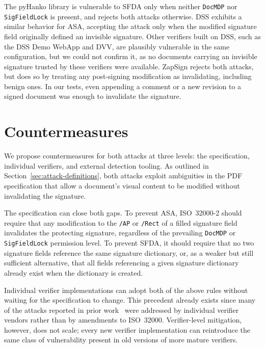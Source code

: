 \documentclass[12pt]{article}
\begin{document}
The pyHanko library is vulnerable to SFDA only when neither \texttt{DocMDP} nor \texttt{SigFieldLock} is present, and rejects both attacks otherwise. DSS exhibits a similar behavior for ASA, accepting the attack only when the modified signature field originally defined an invisible signature. Other verifiers built on DSS, such as the DSS Demo WebApp and DVV, are plausibly vulnerable in the same configuration, but we could not confirm it, as no documents carrying an invisible signature trusted by these verifiers were available. ZapSign rejects both attacks, but does so by treating any post-signing modification as invalidating, including benign ones. In our tests, even appending a comment or a new revision to a signed document was enough to invalidate the signature.



\section{Countermeasures} \label{sec:countermeasures}

We propose countermeasures for both attacks at three levels: the specification, individual verifiers, and external detection tooling.
%
As outlined in Section~\ref{sec:attack-definitions}, both attacks exploit ambiguities in the PDF specification that allow a document's visual content to be modified without invalidating the signature.%

The specification can close both gaps. To prevent ASA, ISO~32000-2 should require that any modification to the \texttt{/AP} or \texttt{/Rect} of a filled signature field invalidates the protecting signature, regardless of the prevailing \texttt{DocMDP} or \texttt{SigFieldLock} permission level. To prevent SFDA, it should require that no two signature fields reference the same signature dictionary, or, as a weaker but still sufficient alternative, that all fields referencing a given signature dictionary already exist when the dictionary is created.

Individual verifier implementations can adopt both of the above rules without waiting for the specification to change. This precedent already exists since many of the attacks reported in prior work~\cite{pdf-certification-attack,shadow-attacks,processing-dangerous-paths,one-trillion-dollar-refund,practical-decryption-exfiltration} were addressed by individual verifier vendors rather than by amendments to ISO~32000. Verifier-level mitigation, however, does not scale; every new verifier implementation can reintroduce the same class of vulnerability present in old versions of more mature verifiers.
\end{document}
